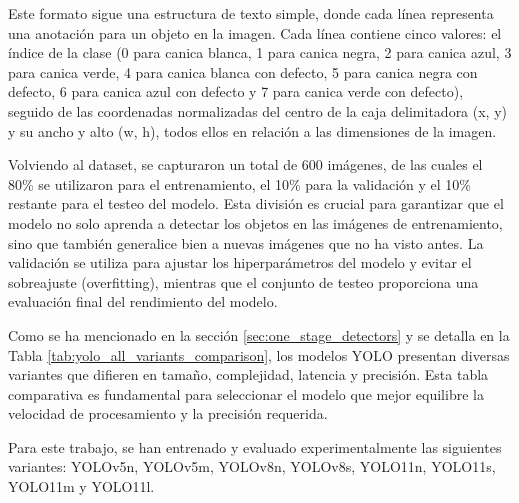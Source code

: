 \documentclass[11pt,spanish,listoffigures,listoftables]{tfgetsinf}
\begin{document}
Este formato sigue una estructura de texto simple, donde cada línea representa una anotación para un objeto en la imagen. Cada línea contiene cinco valores: el índice de la clase (0 para canica blanca, 1 para canica negra, 2 para canica azul, 3 para canica verde, 4 para canica blanca con defecto, 5 para canica negra con defecto, 6 para canica azul con defecto y 7 para canica verde con defecto), seguido de las coordenadas normalizadas del centro de la caja delimitadora (x, y) y su ancho y alto (w, h), todos ellos en relación a las dimensiones de la imagen.

Volviendo al dataset, se capturaron un total de 600 imágenes, de las cuales el 80\% se utilizaron para el entrenamiento, el 10\% para la validación y el 10\% restante para el testeo del modelo. Esta división es crucial para garantizar que el modelo no solo aprenda a detectar los objetos en las imágenes de entrenamiento, sino que también generalice bien a nuevas imágenes que no ha visto antes. La validación se utiliza para ajustar los hiperparámetros del modelo y evitar el sobreajuste (overfitting), mientras que el conjunto de testeo proporciona una evaluación final del rendimiento del modelo.


Como se ha mencionado en la sección \ref{sec:one_stage_detectors} y se detalla en la Tabla \ref{tab:yolo_all_variants_comparison}, los modelos YOLO presentan diversas variantes que difieren en tamaño, complejidad, latencia y precisión. Esta tabla comparativa es fundamental para seleccionar el modelo que mejor equilibre la velocidad de procesamiento y la precisión requerida.

Para este trabajo, se han entrenado y evaluado experimentalmente las siguientes variantes: YOLOv5n, YOLOv5m, YOLOv8n, YOLOv8s, YOLO11n, YOLO11s, YOLO11m y YOLO11l.
\end{document}
